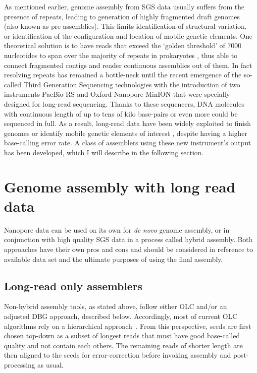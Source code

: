 As mentioned earlier, genome assembly from SGS data usually suffers from the presence of repeats, leading to generation of highly fragmented draft genomes (also known as pre-assemblies). This limits identification of structural variation, or identification of the configuration and location   of mobile genetic elements.
One theoretical solution is to have reads that exceed the `golden threshold' of $7000$ nucleotides to span over the majority of repeats in prokaryotes \cite{KorenP2015}, thus able to connect fragmented contigs and render continuous assemblies out of them.
In fact resolving repeats has remained a bottle-neck until the recent emergence of the so-called Third Generation Sequencing technologies with the introduction of two instruments PacBio RS and Oxford Nanopore MinION that were specially designed for long-read sequencing. Thanks to these sequencers, DNA molecules with continuous length of up to tens of kilo base-pairs or even more could be sequenced in full.
As a result, long-read data have been widely exploited to finish genomes \cite{BashirKR2013,KarlssonLS2015} or identify mobile genetic elements of interest \cite{HudsonBM2014,AshtonND2015}, despite having a higher base-calling error rate.
A class of assemblers using these new instrument's output has been developed, which I will describe in the following section.
\section{Genome assembly with long read data}
Nanopore data can be used on its own for \emph{de novo} genome assembly, or in conjunction with high quality SGS data in a process called hybrid assembly. 
Both approaches have their own pros and cons and should be considered in reference to available data set and the ultimate purposes of using the final assembly.
\subsection{Long-read only assemblers}
Non-hybrid assembly tools, as stated above, follow either OLC and/or an adjusted DBG approach, described below. Accordingly, most of current OLC algorithms rely on a hierarchical approach~\cite{Jayakumar2017compare}. From this perspective, seeds are first chosen top-down as a subset of longest reads that must have good base-called quality and not contain each others. The remaining reads of shorter length are then aligned to the seeds for error-correction before invoking assembly and post-processing as usual.

